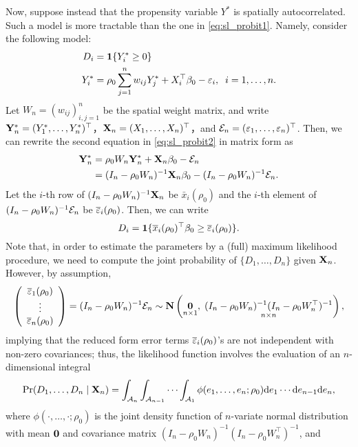 \documentclass[11pt, A4paper, openany, uplatex]{book}
\begin{document}
Now, suppose instead that the propensity variable $Y^*$ is spatially autocorrelated.
Such a model is more tractable than the one in \eqref{eq:sl_probit1}.
Namely, consider the following model:
\begin{align}\label{eq:sl_probit2}
\begin{split}
	D_i & = \mathbf{1}\{Y^*_i \geq 0\}\\
	Y^*_i & = \rho_0 \sum_{j = 1}^n w_{ij} Y^*_j + X_i^\top \beta_0 - \varepsilon_i, \;\;  i =1 , \ldots, n.
\end{split}
\end{align}
Let $W_n = (w_{ij})_{i,j = 1}^n$ be the spatial weight matrix, and write $\mathbf{Y}^*_n = (Y^*_1, \ldots, Y^*_n)^\top$，$\mathbf{X}_n = (X_1, \ldots , X_n)^\top$，and $\mathcal{E}_n = (\varepsilon_1, \ldots , \varepsilon_n)^\top$.
Then, we can rewrite the second equation in \eqref{eq:sl_probit2} in matrix form as
\begin{align*}
	\mathbf{Y}^*_n 
	& =  \rho_0 W_n \mathbf{Y}^*_n + \mathbf{X}_n \beta_0 - \mathcal{E}_n \\
	& = (I_n - \rho_0 W_n)^{-1}\mathbf{X}_n \beta_0 - (I_n - \rho_0 W_n)^{-1}\mathcal{E}_n.
\end{align*}
Let the $i$-th row of $(I_n - \rho_0 W_n)^{-1}\mathbf{X}_n $ be $\bar x_i(\rho_0)$ and the $i$-th element of $(I_n - \rho_0 W_n)^{-1}\mathcal{E}_n$ be $\overline {\varepsilon}_i(\rho_0)$.
Then, we can write
\[
	D_i = \mathbf{1}\{\overline x_i(\rho_0)^\top \beta_0 \geq  \overline {\varepsilon}_i(\rho_0)\}.
\]
Note that, in order to estimate the parameters by a (full) maximum likelihood procedure, we need to compute the joint probability of $\{ D_1, \ldots , D_n \}$ given $\mathbf{X}_n$.
However, by assumption,
\[
	\left( \begin{array}{c}
	\overline {\varepsilon}_1(\rho_0) \\
	\vdots \\
	\overline {\varepsilon}_n(\rho_0)
	\end{array} \right) = (I_n - \rho_0 W_n)^{-1}\mathcal{E}_n \sim \mathbf{N}\left(\underset{n \times 1}{\mathbf{0}}, \; \underset{n \times n}{(I_n - \rho_0 W_n)^{-1}(I_n - \rho_0 W_n^\top)^{-1}}\right),
\]
implying that the reduced form error terms $\overline {\varepsilon}_i(\rho_0)$'s are not independent with non-zero covariances; thus, the likelihood function involves the evaluation of an $n$-dimensional integral
\[
	\Pr(D_1, \ldots , D_n \mid \mathbf{X}_n) = \int_{\mathcal{A}_n} \int_{\mathcal{A}_{n-1}} \cdots \int_{\mathcal{A}_1} \phi(e_1, \ldots, e_n; \rho_0) \mathrm{d}e_1 \cdots \mathrm{d}e_{n-1}\mathrm{d}e_n,
\]
where $\phi(\cdot, \ldots, \cdot; \rho_0)$ is the joint density function of $n$-variate normal distribution with mean $\mathbf{0}$ and covariance matrix $(I_n - \rho_0 W_n)^{-1}(I_n - \rho_0 W_n^\top)^{-1}$, and
\end{document}
